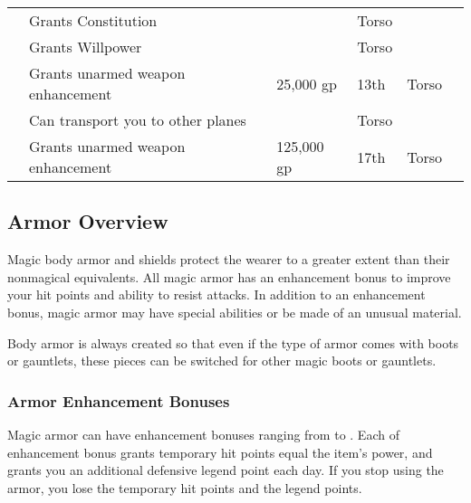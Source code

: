 \begin{longtabuwrapper}
\begin{longtabu}{l X l l l l}
                 & Grants  Constitution &  & Torso &  \\
                 & Grants  Willpower &  & Torso &  \\
                  & Grants  unarmed weapon enhancement & 25,000 gp & 13th & Torso &  \\
                 & Can transport you to other planes &  & Torso &  \\
                  & Grants  unarmed weapon enhancement & 125,000 gp & 17th & Torso &  \\
            \end{longtabu}
        \end{longtabuwrapper}
        \twocolumn

    \subsection{Armor Overview}

        Magic body armor and shields protect the wearer to a greater extent than their nonmagical equivalents.
        All magic armor has an enhancement bonus to improve your hit points and ability to resist attacks.
        In addition to an enhancement bonus, magic armor may have special abilities or be made of an unusual material.

        Body armor is always created so that even if the type of armor comes with boots or gauntlets, these pieces can be switched for other magic boots or gauntlets.

        \subsubsection{Armor Enhancement Bonuses}\label{Armor Enhancement Bonuses}

            Magic armor can have enhancement bonuses ranging from  to .
            Each  of enhancement bonus grants temporary hit points equal the item's power, and grants you an additional defensive legend point each day.
            If you stop using the armor, you lose the temporary hit points and the legend points.

